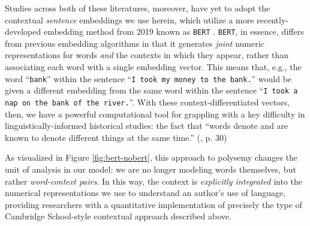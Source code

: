 \documentclass[11pt]{article}
\newcommand{\BERT}[0]{\texttt{BERT}}
\begin{document}
Studies across both of these literatures, moreover, have yet to adopt the contextual \textit{sentence} embeddings we use herein, which utilize a more recently-developed embedding method from 2019 known as \BERT{} \parencite{devlin_bert_2019}. \BERT{}, in essence, differs from previous embedding algorithms in that it generates \textit{joint} numeric representations for words \textit{and} the contexts in which they appear, rather than associating each word with a single embedding vector. This means that, e.g., the word ``\texttt{bank}'' within the sentence ``\texttt{I took my money to the bank.}'' would be given a different embedding from the same word within the sentence ``\texttt{I took a nap on the bank of the river.}''. With these context-differentiated vectors, then, we have a powerful computational tool for grappling with a key difficulty in linguistically-informed historical studies: the fact that ``words denote and are known to denote different things at the same time.'' (\cite{pocock_virtue_1985}, p. 30)

As visualized in Figure \ref{fig:bert-nobert}, this approach to polysemy changes the unit of analysis in our model: we are no longer modeling words themselves, but rather \textit{word-context pairs}. In this way, the context is \textit{explicitly integrated} into the numerical representations we use to understand an author's use of language, providing researchers with a quantitative implementation of precisely the type of Cambridge School-style contextual approach described above.


\end{document}
